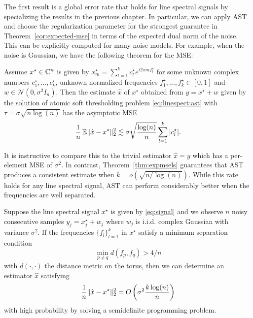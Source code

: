 The first result is a global error rate that holds for line spectral signals by
specializing the results in the previous chapter. In particular, we can apply
AST and choose the regularization parameter for the strongest guarantee in
Theorem~\ref{cor:expected-mse} in terms of the expected dual norm of the noise.
This can be explicitly computed for many noise models. For example, when the
noise is Gaussian, we have the following theorem for the MSE:

\begin{theorem}
\label{thm:expmsels}

Assume $x^\star \in \mathbb{C}^n$ is given by $x_m^\star = \sum_{l=1}^k{c_l^\star
e^{i2\pi m f_l^\star}}$ for some unknown complex numbers $c_1^\star, \ldots,
c_k^\star$, unknown normalized frequencies $f_1^\star, \ldots, f_k^\star \in
[0,1]$ and $w \in \mathcal{N}(0,\sigma^2 I_n)$. Then the estimate $\hat{x}$ of
$x^\star$ obtained from $y=x^\star+w$ given by the solution of atomic soft
thresholding problem \eqref{eq:linespect:ast} with $\tau = \sigma \sqrt{n \log(n)}$ has the
asymptotic MSE \belowdisplayskip=-10pt \[ \frac{1}{n} \operatorname{\mathbb{E}} \lVert\hat{x} -
x^\star\rVert_2^2 \lesssim \sigma\sqrt{\frac{\log(n)}{n}}\sum_{l=1}^k |c_l^\star|. \]
\end{theorem}

It is instructive to compare this to the trivial estimator $\hat{x} = y$ which
has a per-element MSE of $\sigma^2$. In contrast, Theorem~\ref{thm:expmsels}
guarantees that AST produces a consistent estimate when $k =
o\left(\sqrt{n/\log(n)}\right)$. While this rate holds for any line spectral
signal, AST can perform considerably better when the frequencies are well
separated.

\begin{theorem}
\label{main}
Suppose the line spectral signal $x^\star$ is given by \eqref{eq:signal} and we
observe $n$ noisy consecutive samples $y_j = x^\star_j + w_j$ where $w_j$ is
i.i.d. complex Gaussian with variance $\sigma^2$. If the frequencies
$\{f_l\}_{l=1}^k$ in $x^\star$ satisfy a minimum separation condition
\begin{equation}
\label{min-sep}
\min_{p\neq q}d(f_p,f_q) > 4/n
\end{equation}
with $d(\cdot, \cdot)$ the distance metric on the torus, then we can determine an estimator $\hat{x}$ satisfying
\begin{equation}
\label{fast-rate}
\frac{1}{n}\lVert\hat{x} - x^\star\rVert_2^2 = O\left( \sigma^2 \frac{k \log(n)}{n}\right)  
\end{equation}
with high probability by solving a semidefinite programming problem.
\end{theorem}

